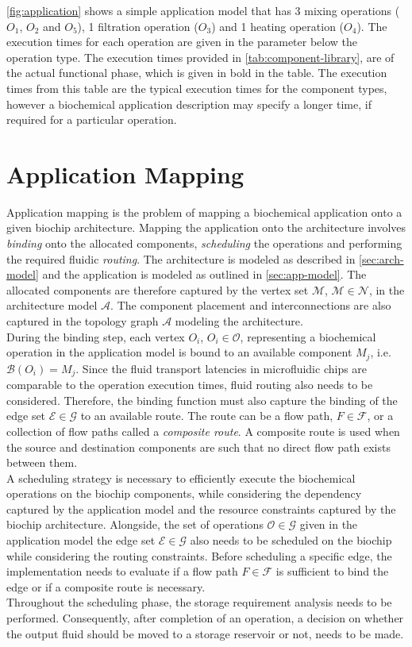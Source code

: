 \autoref{fig:application} shows a simple application model that has 3 mixing operations ($O_1$, $O_2$ and $O_5$), 1 filtration operation ($O_3$) and 1 heating operation ($O_4$). The execution times for each operation are given in the parameter below the operation type. The execution times provided in \autoref{tab:component-library}, are of the actual functional phase, which is given in bold in the table. The execution times from this table are the typical execution times for the component types, however a biochemical application description may specify a longer time, if required for a particular operation.


\section{Application Mapping}
\label{sec:app-map}
Application mapping is the problem of mapping a biochemical application onto a given biochip architecture. Mapping the application onto the architecture involves \emph{binding} onto the allocated components, \emph{scheduling} the operations and performing the required fluidic \emph{routing}. The architecture is modeled as described in \autoref{sec:arch-model} and the application is modeled as outlined in \autoref{sec:app-model}. The allocated components are therefore captured by the vertex set $\mathcal{M}$, $\mathcal{M} \in \mathcal{N}$, in the architecture model $\mathcal{A}$. The component placement and interconnections are also captured in the topology graph $\mathcal{A}$ modeling the architecture.\\
During the binding step, each vertex $O_i$, $O_i \in \mathcal{O}$, representing a biochemical operation in the application model is bound to an available component $M_j$, i.e. $\mathcal{B}(O_i) = M_j$. Since the fluid transport latencies in microfluidic chips are comparable to the operation execution times, fluid routing also needs to be considered. Therefore, the binding function must also capture the binding of the edge set $\mathcal{E} \in \mathcal{G}$ to an available route. The route can be a flow path, $F \in \mathcal{F}$, or a collection of flow paths called a \emph{composite route}. A composite route is used when the source and destination components are such that no direct flow path exists between them.\\
A scheduling strategy is necessary to efficiently execute the biochemical operations on the biochip components, while considering the dependency captured by the application model and the resource constraints captured by the biochip architecture. Alongside, the set of operations $\mathcal{O} \in \mathcal{G}$ given in the application model the edge set $\mathcal{E} \in \mathcal{G}$ also needs to be scheduled on the biochip while considering the routing constraints. Before scheduling a specific edge, the implementation needs to evaluate if a flow path $F \in \mathcal{F}$ is sufficient to bind the edge or if a composite route is necessary.\\
Throughout the scheduling phase, the storage requirement analysis needs to be performed. Consequently, after completion of an operation, a decision on whether the output fluid should be moved to a storage reservoir or not, needs to be made.


